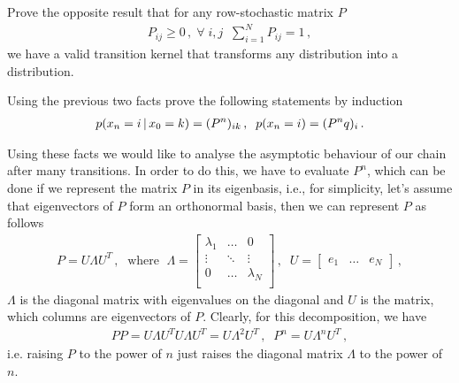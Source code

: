 \begin{exercise}
    Prove the opposite result that for any row-stochastic matrix $P$
    \begin{align}
        P_{ij} \geq 0\,, \;\forall \;i,j\;\;\sum_{i=1}^N P_{ij} = 1\,,
    \end{align}
    we have a valid transition kernel that transforms any distribution into a distribution.
\end{exercise}

\begin{exercise}
    Using the previous two facts prove the following statements by induction
    \begin{align}
        p(x_n=i\,|\, x_{0}=k) = (P^n)_{ik}\,,\;\; p(x_n=i) = (P^n q)_{i}\,.
    \end{align}
\end{exercise}

Using these facts we would like to analyse the asymptotic behaviour of our chain after many transitions. In order to do this, we have to evaluate $P^n$, which can be done if we represent the matrix $P$ in its eigenbasis, i.e., for simplicity, let's assume that eigenvectors of $P$ form an orthonormal basis, then we can represent $P$ as follows
\begin{align}
    P = U\Lambda U^T\,,\; \text{ where }\; 
    \Lambda = \begin{bmatrix}
    \lambda_1 & \ldots & 0\\
    \vdots & \ddots & \vdots\\
    0 & \ldots & \lambda_N\\
    \end{bmatrix}\,,\;\;
    U = \begin{bmatrix}
    e_1 & \ldots & e_N
    \end{bmatrix}\,,
\end{align}
$\Lambda$ is the diagonal matrix with eigenvalues on the diagonal and $U$ is the matrix, which columns are eigenvectors of $P$. Clearly, for this decomposition, we have
\begin{align}
    PP = U\Lambda U^TU\Lambda U^T = U\Lambda^2 U^T\,,\;\; P^n = U\Lambda^n U^T\,,
\end{align}
i.e. raising $P$ to the power of $n$ just raises the diagonal matrix $\Lambda$ to the power of $n$.

